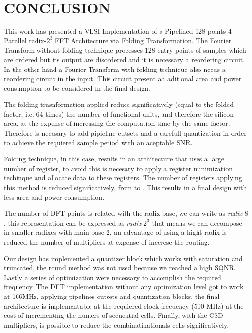 \documentclass[journal,comsoc]{IEEEtran}
\begin{document}
\section{CONCLUSION}
This work has presented a VLSI Implementation of a Pipelined 128 points 4-Parallel radix-$2^3$ FFT Architecture via Folding Transformation. The Fourier Transform without folding technique processes 128 entry points of samples which are ordered but its output are disordered and it is necessary a reordering circuit. In the other hand a Fourier Transform with folding technique also needs a reordering circuit in the input. This circuit present an aditional area and power consumption to be considered in the final design. 

The folding trasnformation applied reduce significatively (equal to the folded factor, i.e. 64 times) the number of functional units, and therefore the silicon area, at the expense of increasing the computation time by the same factor. Therefore is necesary to add pipieline cutsets and a carefull quantization in order to achieve the requiered sample period with an aceptable SNR.

Folding technique, in this case, results in an architecture that uses a large number of register, to avoid this is necesary to apply a register minimization techinque and allocate data to these registers. The number of registers applying this method is reduced significatively, from  to . This results in a final design with less area and power consumption. %


The number of DFT points is related with the radix-base, we can write as \textit{radix}-$8$, this representation can be expressed as \textit{radix}-$2^3$ that means we can decompose in smaller radixes with main base-2, an advantage of using a hight radix is reduced the number of multipliers at expense of incerese the routing.

Our design has implemented a quantizer block which works with saturation and truncated, the round method was not used because we reached a high SQNR. Lastly a series of optimization were necessary to accomplish the required frequency. The DFT implementation without any optimization level got to work at 166MHz, applying pipelines cutsets and quantization blocks, the final architecture is implementable at the requiered clock frecuency (500 MHz) at the cost of incrementing the numers of secuential cells. Finally, with the CSD multipliers, is possible to reduce the combinatinationals cells significatively. 




\end{document}
